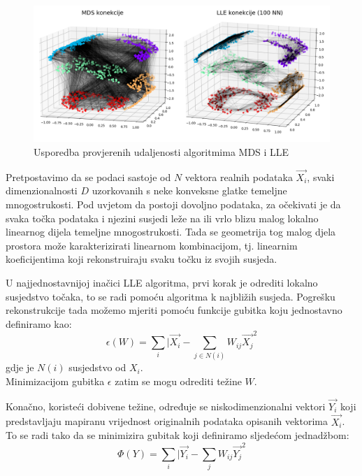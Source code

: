 \documentclass[times, utf8, diplomski]{fer}
\begin{document}
\begin{figure}[htb]
    \centering
    \includegraphics[width=\textwidth]{resources/images/reduction/connections.png}
    \caption{Usporedba provjerenih udaljenosti algoritmima MDS i LLE}
    \label{fig:connections}
\end{figure}

Pretpostavimo da se podaci sastoje od $N$ vektora realnih podataka $\vec{X_i}$, svaki dimenzionalnosti $D$ uzorkovanih s neke konveksne glatke temeljne mnogostrukosti. Pod uvjetom da postoji dovoljno podataka, za očekivati je da svaka točka podataka i njezini susjedi leže na ili vrlo blizu malog lokalno linearnog dijela temeljne mnogostrukosti. Tada se geometrija tog malog djela prostora može karakterizirati linearnom kombinacijom, tj. linearnim koeficijentima koji rekonstruiraju svaku točku iz svojih susjeda.

U najjednostavnijoj inačici LLE algoritma, prvi korak je odrediti lokalno susjedstvo točaka, to se radi pomoću algoritma k najbližih susjeda. Pogrešku rekonstrukcije tada možemo mjeriti pomoću funkcije gubitka koju jednostavno definiramo kao:
\begin{equation}
    \epsilon(W) = \sum_i \vert{\vec{X_i} - \sum_{j \in N(i)} W_{ij} \vec{X_j}}^2
    \label{eq:lle1}
\end{equation}
gdje je $N(i)$ susjedstvo od $X_i$.\\
Minimizacijom gubitka $\epsilon$ zatim se mogu odrediti težine $W$.

Konačno, koristeći dobivene težine, određuje se niskodimenzionalni vektori $\vec{Y_i}$ koji predstavljaju mapiranu vrijednost originalnih podataka opisanih vektorima $\vec{X_i}$. To se radi tako da se minimizira gubitak koji definiramo sljedećom jednadžbom:
\begin{equation}
    \Phi(Y) = \sum_i \vert{\vec{Y_i} - \sum_{j} W_{ij} \vec{Y_j}}^2
    \label{eq:lle2}
\end{equation}
\end{document}
